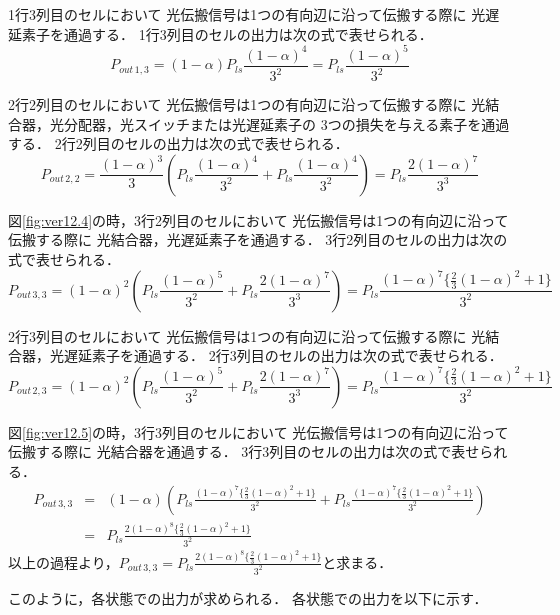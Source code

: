 \begin{itemize}
1行3列目のセルにおいて
光伝搬信号は1つの有向辺に沿って伝搬する際に
光遅延素子を通過する．
1行3列目のセルの出力は次の式で表せられる．
$$
P_{out\,1,3}=(1-\alpha)P_{ls}\frac{(1-\alpha)^4}{3^2}=P_{ls}\frac{(1-\alpha)^5}{3^2}
$$

2行2列目のセルにおいて
光伝搬信号は1つの有向辺に沿って伝搬する際に
光結合器，光分配器，光スイッチまたは光遅延素子の
3つの損失を与える素子を通過する．
2行2列目のセルの出力は次の式で表せられる．
$$P_{out\,2,2}=\frac{(1-\alpha)^3}{3}(P_{ls}\frac{(1-\alpha)^4}{3^2}+P_{ls}\frac{(1-\alpha)^4}{3^2})
=P_{ls}\frac{2(1-\alpha)^7}{3^3}$$

図\ref{fig:ver12.4}の時，3行2列目のセルにおいて
光伝搬信号は1つの有向辺に沿って伝搬する際に
光結合器，光遅延素子を通過する．
3行2列目のセルの出力は次の式で表せられる．
$$P_{out\,3,3}=(1-\alpha)^2(P_{ls}\frac{(1-\alpha)^5}{3^2}+P_{ls}\frac{2(1-\alpha)^7}{3^3})
=P_{ls}\frac{(1-\alpha)^7\bigl\{\frac{2}{3}(1-\alpha)^2+1\bigl\}}{3^2}$$

2行3列目のセルにおいて
光伝搬信号は1つの有向辺に沿って伝搬する際に
光結合器，光遅延素子を通過する．
2行3列目のセルの出力は次の式で表せられる．
$$P_{out\,2,3}=(1-\alpha)^2(P_{ls}\frac{(1-\alpha)^5}{3^2}+P_{ls}\frac{2(1-\alpha)^7}{3^3})
=P_{ls}\frac{(1-\alpha)^7\bigl\{\frac{2}{3}(1-\alpha)^2+1\bigl\}}{3^2}$$

図\ref{fig:ver12.5}の時，3行3列目のセルにおいて
光伝搬信号は1つの有向辺に沿って伝搬する際に
光結合器を通過する．
3行3列目のセルの出力は次の式で表せられる．
\begin{eqnarray*}
P_{out\,3,3}&=&(1-\alpha)(P_{ls}\frac{(1-\alpha)^7\bigl\{\frac{2}{3}(1-\alpha)^2+1\bigl\}}{3^2}+P_{ls}\frac{(1-\alpha)^7\bigl\{\frac{2}{3}(1-\alpha)^2+1\bigl\}}{3^2})\\
&=&P_{ls}\frac{2(1-\alpha)^8\bigl\{\frac{2}{3}(1-\alpha)^2+1\bigl\}}{3^2}
\end{eqnarray*}
以上の過程より，$P_{out\,3,3}=P_{ls}\frac{2(1-\alpha)^8\bigl\{\frac{2}{3}(1-\alpha)^2+1\bigl\}}{3^2}$と求まる．
\end{itemize}
このように，各状態での出力が求められる．
各状態での出力を以下に示す．
